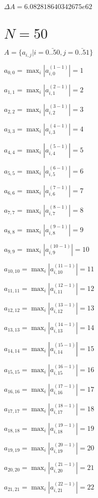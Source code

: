 \documentclass[a4paper,12pt]{article}
\begin{document}
$\Delta A = 6.082818640342675e62$



\section{ $N = 50$ }
$A = \{ a _{ i, j } | i = \bar { 0..50 }, j = \bar { 0..51 } \}$

$a _{ 0, 0 } =  \max _i |a _{ i, 0 } ^{ (1 - 1) } | = 1$

$a _{ 1, 1 } =  \max _i |a _{ i, 1 } ^{ (2 - 1) } | = 2$

$a _{ 2, 2 } =  \max _i |a _{ i, 2 } ^{ (3 - 1) } | = 3$

$a _{ 3, 3 } =  \max _i |a _{ i, 3 } ^{ (4 - 1) } | = 4$

$a _{ 4, 4 } =  \max _i |a _{ i, 4 } ^{ (5 - 1) } | = 5$

$a _{ 5, 5 } =  \max _i |a _{ i, 5 } ^{ (6 - 1) } | = 6$

$a _{ 6, 6 } =  \max _i |a _{ i, 6 } ^{ (7 - 1) } | = 7$

$a _{ 7, 7 } =  \max _i |a _{ i, 7 } ^{ (8 - 1) } | = 8$

$a _{ 8, 8 } =  \max _i |a _{ i, 8 } ^{ (9 - 1) } | = 9$

$a _{ 9, 9 } =  \max _i |a _{ i, 9 } ^{ (10 - 1) } | = 10$

$a _{ 10, 10 } =  \max _i |a _{ i, 10 } ^{ (11 - 1) } | = 11$

$a _{ 11, 11 } =  \max _i |a _{ i, 11 } ^{ (12 - 1) } | = 12$

$a _{ 12, 12 } =  \max _i |a _{ i, 12 } ^{ (13 - 1) } | = 13$

$a _{ 13, 13 } =  \max _i |a _{ i, 13 } ^{ (14 - 1) } | = 14$

$a _{ 14, 14 } =  \max _i |a _{ i, 14 } ^{ (15 - 1) } | = 15$

$a _{ 15, 15 } =  \max _i |a _{ i, 15 } ^{ (16 - 1) } | = 16$

$a _{ 16, 16 } =  \max _i |a _{ i, 16 } ^{ (17 - 1) } | = 17$

$a _{ 17, 17 } =  \max _i |a _{ i, 17 } ^{ (18 - 1) } | = 18$

$a _{ 18, 18 } =  \max _i |a _{ i, 18 } ^{ (19 - 1) } | = 19$

$a _{ 19, 19 } =  \max _i |a _{ i, 19 } ^{ (20 - 1) } | = 20$

$a _{ 20, 20 } =  \max _i |a _{ i, 20 } ^{ (21 - 1) } | = 21$

$a _{ 21, 21 } =  \max _i |a _{ i, 21 } ^{ (22 - 1) } | = 22$
\end{document}
